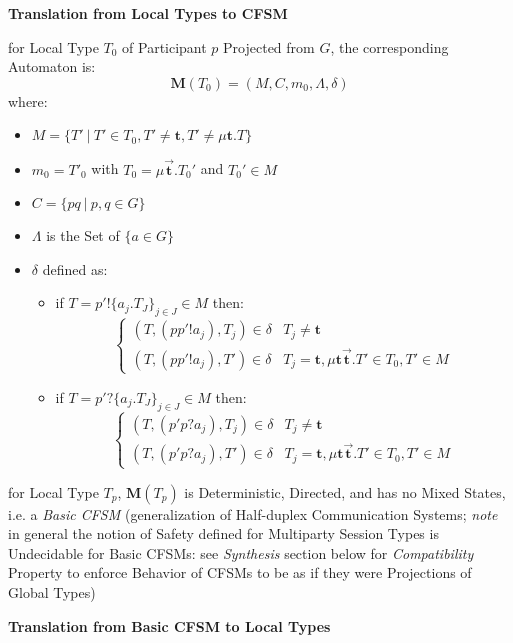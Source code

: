 \textbf{Translation from Local Types to CFSM}

for Local Type $T_0$ of Participant $p$ Projected from $G$, the
corresponding Automaton is:
\[
  \mathbf{M}(T_0) = (M,C,m_0,\Lambda,\delta)
\]
where:
\begin{itemize}
  \item $M = \{ T' \ |\ T' \in T_0, T' \neq \mathbf{t},
    T' \neq \mu\mathbf{t}.T \}$
  \item $m_0 = T'_0$ with $T_0 = \mu\vec{\mathbf{t}}.T_0'$ and $T_0'
    \in M$
  \item $C = \{ pq \ |\ p,q \in G \}$
  \item $\Lambda$ is the Set of $\{ a \in G \}$
  \item $\delta$ defined as:
    \begin{itemize}
      \item if $T = p'!\{a_j.T_J\}_{j \in J} \in M$ then:
\[
  \begin{cases}
    (T,(pp'!a_j),T_j) \in \delta & T_j \neq \mathbf{t} \\
    (T,(pp'!a_j),T') \in \delta & T_j = \mathbf{t},
      \mu\mathbf{t}\vec{\mathbf{t}}.T' \in T_0, T' \in M
  \end{cases}
\]
      \item if $T = p'?\{a_j.T_J\}_{j \in J} \in M$ then:
\[
  \begin{cases}
    (T,(p'p?a_j),T_j) \in \delta & T_j \neq \mathbf{t} \\
    (T,(p'p?a_j),T') \in \delta & T_j = \mathbf{t},
      \mu\mathbf{t}\vec{\mathbf{t}}.T' \in T_0, T' \in M
  \end{cases}
\]
    \end{itemize}
\end{itemize}

for Local Type $T_p$, $\mathbf{M}(T_p)$ is Deterministic, Directed,
and has no Mixed States, i.e. a \emph{Basic CFSM} (generalization of
Half-duplex Communication Systems; \emph{note} in general the notion
of Safety defined for Multiparty Session Types is Undecidable for
Basic CFSMs: see \emph{Synthesis} section below for
\emph{Compatibility} Property to enforce Behavior of CFSMs to be as if
they were Projections of Global Types)


\textbf{Translation from Basic CFSM to Local Types}

